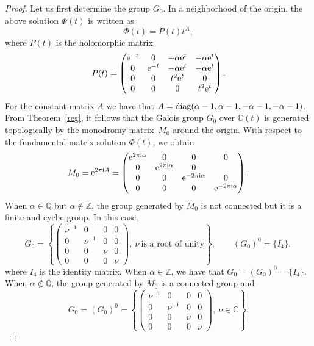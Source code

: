 \documentclass[10pt,a4paper]{article}
\numberwithin{equation}{section}
\begin{document}
\begin{proof}
 Let us first determine the group $G_0$.
 In a neighborhood of the origin, the above solution $\Phi(t)$ is written as
 \[
 \Phi(t)=P(t) t^A ,
 \]
 where $P(t)$ is the holomorphic matrix
 \[
 P(t)=\begin{pmatrix}
 {\rm e}^{-t} & 0 & -\alpha {\rm e}^t & -\alpha {\rm e}^t\\
 0 & {\rm e}^{-t} & - \alpha {\rm e}^t & -\alpha {\rm e}^t \\
 0 & 0 & t^2 {\rm e}^t & 0\\
 0 & 0 & 0 & t^2 {\rm e}^t
 \end{pmatrix} .
 \]
 For the constant matrix $A$ we have that $A={\rm diag} (\alpha-1, \alpha-1, -\alpha-1, -\alpha-1)$.
 From Theorem~\ref{reg}, it follows that the Galois group $G_0$ over $\mathbb{C}(t)$ is generated topologically by the monodromy matrix~$M_0$ around the origin.
 With respect to the fundamental matrix solution $\Phi(t)$, we obtain
 \[
 M_0={\rm e}^{2 \pi {\rm i} A}=\begin{pmatrix}
 {\rm e}^{2 \pi {\rm i} \alpha} & 0 & 0 & 0\\
 0 & {\rm e}^{2 \pi {\rm i} \alpha} & 0\\
 0 & 0 & {\rm e}^{-2 \pi {\rm i} \alpha} & 0\\
 0 & 0 & 0 & {\rm e}^{-2 \pi {\rm i} \alpha}
 \end{pmatrix} .
 \]
 When $\alpha\in\mathbb{Q}$ but $\alpha\notin\mathbb{Z}$, the group generated by $M_0$ is not connected but it is a finite and cyclic group. In this case,
 \[
 G_0=\left\{\begin{pmatrix}
 \nu^{-1} & 0 & 0 & 0\\
 0 & \nu^{-1} & 0 & 0\\
 0 & 0 & \nu & 0\\
 0 & 0 & 0 & \nu
 \end{pmatrix}, \ \nu \ \text{is a root of unity} \right\}, \qquad (G_0)^0=\{I_4\} ,
 \]
 where $I_4$ is the identity matrix. When $\alpha\in\mathbb{Z}$, we have that $G_0=(G_0)^0=\{I_4\}$. When $\alpha\notin\mathbb{Q}$, the group generated by $M_0$ is a connected group
 and
 \[
 G_0=(G_0)^0=\left\{ \begin{pmatrix}
 \nu^{-1} & 0 & 0 & 0\\
 0 & \nu^{-1} & 0 & 0\\
 0 & 0 & \nu & 0\\
 0 & 0 & 0 & \nu
 \end{pmatrix},\ \nu\in\mathbb{C} \right\} .
 \]


\end{proof}
\end{document}
